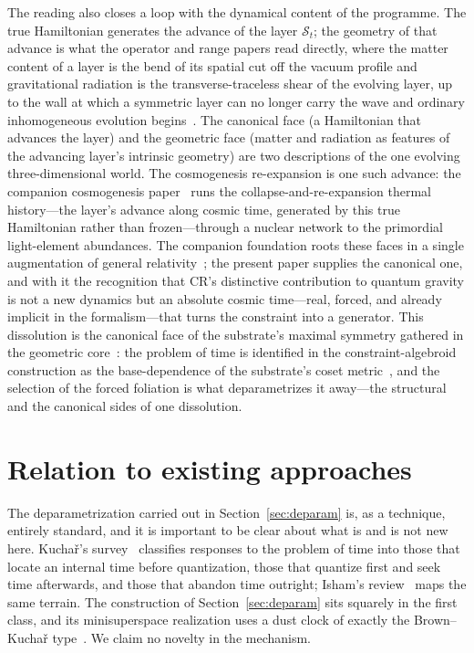 \documentclass[11pt,a4paper]{article}
\theoremstyle{plain}
\theoremstyle{definition}
\theoremstyle{remark}
\newcommand{\St}{\mathcal{S}_t}
\begin{document}
The reading also closes a loop with the dynamical content of the programme. The true Hamiltonian generates the advance of the layer $\St$; the geometry of that advance is what the operator and range papers read directly, where the matter content of a layer is the bend of its spatial cut off the vacuum profile and gravitational radiation is the transverse-traceless shear of the evolving layer, up to the wall at which a symmetric layer can no longer carry the wave and ordinary inhomogeneous evolution begins~\cite{JanzenOperator, JanzenRange}. The canonical face (a Hamiltonian that advances the layer) and the geometric face (matter and radiation as features of the advancing layer's intrinsic geometry) are two descriptions of the one evolving three-dimensional world. The cosmogenesis re-expansion is one such advance: the companion cosmogenesis paper~\cite{JanzenCosmogenesis} runs the collapse-and-re-expansion thermal history---the layer's advance along cosmic time, generated by this true Hamiltonian rather than frozen---through a nuclear network to the primordial light-element abundances. The companion foundation roots these faces in a single augmentation of general relativity~\cite{JanzenModernParallax}; the present paper supplies the canonical one, and with it the recognition that CR's distinctive contribution to quantum gravity is not a new dynamics but an absolute cosmic time---real, forced, and already implicit in the formalism---that turns the constraint into a generator. This dissolution is the canonical face of the substrate's maximal symmetry gathered in the geometric core~\cite{JanzenGeometricCore}: the problem of time is identified in the constraint-algebroid construction as the base-dependence of the substrate's coset metric~\cite{JanzenAlgebroid}, and the selection of the forced foliation is what deparametrizes it away---the structural and the canonical sides of one dissolution.

\section{Relation to existing approaches}\label{sec:relation}

The deparametrization carried out in Section~\ref{sec:deparam} is, as a technique, entirely standard, and it is important to be clear about what is and is not new here. Kucha\v{r}'s survey~\cite{Kuchar1992} classifies responses to the problem of time into those that locate an internal time before quantization, those that quantize first and seek time afterwards, and those that abandon time outright; Isham's review~\cite{Isham1993} maps the same terrain. The construction of Section~\ref{sec:deparam} sits squarely in the first class, and its minisuperspace realization uses a dust clock of exactly the Brown--Kucha\v{r} type~\cite{BrownKuchar1995}. We claim no novelty in the mechanism.
\end{document}
